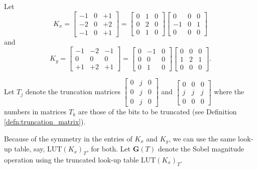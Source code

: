 \documentclass[12pt]{amsart}
\theoremstyle{definition}
\theoremstyle{remark}
\numberwithin{thm}{section}
\newcommand{\LUT}{\text{LUT}}
\begin{document}
Let $$K_x=\begin{bmatrix} 
 -1 & 0 & +1  \\
-2 & 0 & +2 \\
-1 & 0 & +1 
\end{bmatrix}=
\begin{bmatrix}0 &1 &0\\0 &2 &0 \\0 &1 &0
\end{bmatrix}
\begin{bmatrix}0 &0 &0\\-1 & 0 & 1\\ 0 & 0 &0\end{bmatrix}$$ and
$$K_y=\begin{bmatrix} 
 -1 & -2 & -1  \\
0 & 0 & 0 \\
+1 & +2 & +1 
\end{bmatrix}=
\begin{bmatrix}0 &-1 &0\\0 &0 &0\\0 &1 &0
\end{bmatrix}
\begin{bmatrix}0 & 0 & 0\\ 1 & 2 & 1 \\ 0 &0 &0\end{bmatrix}.$$





Let $T_j$ denote the truncation matrices
$\begin{bmatrix}
0 & j & 0\\
0 & j & 0\\
0 & j & 0
\end{bmatrix}
$ and 
$\begin{bmatrix}
0 & 0 & 0\\
j & j & j\\
0 & 0 & 0
\end{bmatrix}
$
where the numbers in matrices $T_k$ are those of the bits to be truncated (see Definition \ref{defn:truncation_matrix}). 

Because of the symmetry in the entries of $K_x$ and $K_y$, we can use the same look-up table, say, $\LUT(K_x)_T$, for both.
Let $\mathbf{G}(T)$ denote the Sobel magnitude operation using the truncated look-up table $\LUT(K_x)_T$.
\end{document}
